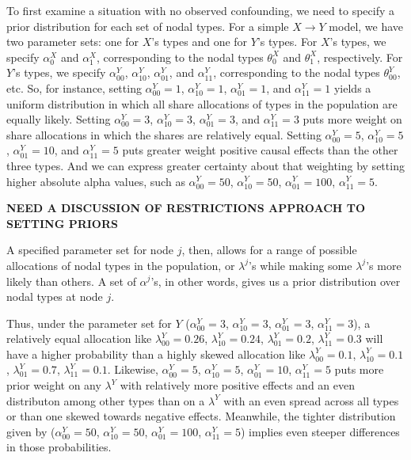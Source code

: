 \documentclass[
  12pt,
]{book}
\begin{document}
To first examine a situation with no observed confounding, we need to specify a prior distribution for each set of nodal types. For a simple \(X \rightarrow Y\) model, we have two parameter sets: one for \(X\)'s types and one for \(Y\)'s types. For \(X\)'s types, we specify \(\alpha^X_0\) and \(\alpha^X_1\), corresponding to the nodal types \(\theta^X_0\) and \(\theta^X_1\), respectively. For \(Y\)'s types, we specify \(\alpha^Y_{00}\), \(\alpha^Y_{10}\), \(\alpha^Y_{01}\), and \(\alpha^Y_{11}\), corresponding to the nodal types \(\theta^Y_{00}\), etc. So, for instance, setting \(\alpha^Y_{00}=1\), \(\alpha^Y_{10}=1\), \(\alpha^Y_{01}=1\), and \(\alpha^Y_{11}=1\) yields a uniform distribution in which all share allocations of types in the population are equally likely. Setting \(\alpha^Y_{00}=3\), \(\alpha^Y_{10}=3\), \(\alpha^Y_{01}=3\), and \(\alpha^Y_{11}=3\) puts more weight on share allocations in which the shares are relatively equal. Setting \(\alpha^Y_{00}=5\), \(\alpha^Y_{10}=5\), \(\alpha^Y_{01}=10\), and \(\alpha^Y_{11}=5\) puts greater weight positive causal effects than the other three types. And we can express greater certainty about that weighting by setting higher absolute alpha values, such as \(\alpha^Y_{00}=50\), \(\alpha^Y_{10}=50\), \(\alpha^Y_{01}=100\), \(\alpha^Y_{11}=5\).

\textbf{NEED A DISCUSSION OF RESTRICTIONS APPROACH TO SETTING PRIORS}

A specified parameter set for node \(j\), then, allows for a range of possible allocations of nodal types in the population, or \(\lambda^j\)'s while making some \(\lambda^j\)'s more likely than others. A set of \(\alpha^j\)'s, in other words, gives us a prior distribution over nodal types at node \(j\).

Thus, under the parameter set for \(Y\) (\(\alpha^Y_{00}=3\), \(\alpha^Y_{10}=3\), \(\alpha^Y_{01}=3\), \(\alpha^Y_{11}=3\)), a relatively equal allocation like \(\lambda^Y_{00}=0.26\), \(\lambda^Y_{10}=0.24\), \(\lambda^Y_{01}=0.2\), \(\lambda^Y_{11}=0.3\) will have a higher probability than a highly skewed allocation like \(\lambda^Y_{00}=0.1\), \(\lambda^Y_{10}=0.1\), \(\lambda^Y_{01}=0.7\), \(\lambda^Y_{11}=0.1\). Likewise, \(\alpha^Y_{00}=5\), \(\alpha^Y_{10}=5\), \(\alpha^Y_{01}=10\), \(\alpha^Y_{11}=5\) puts more prior weight on any \(\lambda^Y\) with relatively more positive effects and an even distributon among other types than on a \(\lambda^Y\) with an even spread across all types or than one skewed towards negative effects. Meanwhile, the tighter distribution given by (\(\alpha^Y_{00}=50\), \(\alpha^Y_{10}=50\), \(\alpha^Y_{01}=100\), \(\alpha^Y_{11}=5\)) implies even steeper differences in those probabilities.
\end{document}
